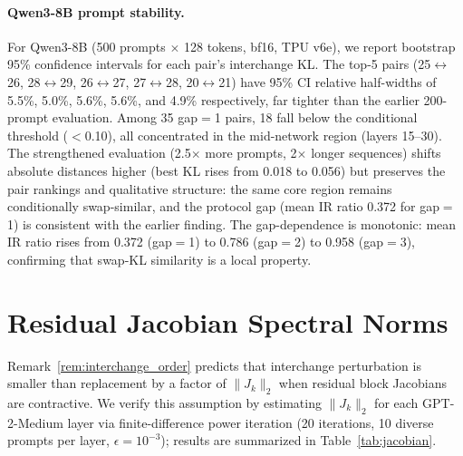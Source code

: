 \documentclass{article}
\begin{document}
\paragraph{Qwen3-8B prompt stability.}
For Qwen3-8B (500 prompts $\times$ 128 tokens, bf16, TPU v6e), we report bootstrap 95\% confidence intervals for each pair's interchange KL. The top-5 pairs (25$\leftrightarrow$26, 28$\leftrightarrow$29, 26$\leftrightarrow$27, 27$\leftrightarrow$28, 20$\leftrightarrow$21) have 95\% CI relative half-widths of 5.5\%, 5.0\%, 5.6\%, 5.6\%, and 4.9\% respectively, far tighter than the earlier 200-prompt evaluation. Among 35 gap$=$1 pairs, 18 fall below the conditional threshold ($<$0.10), all concentrated in the mid-network region (layers 15--30). The strengthened evaluation (2.5$\times$ more prompts, 2$\times$ longer sequences) shifts absolute distances higher (best KL rises from 0.018 to 0.056) but preserves the pair rankings and qualitative structure: the same core region remains conditionally swap-similar, and the protocol gap (mean IR ratio 0.372 for gap$=$1) is consistent with the earlier finding. The gap-dependence is monotonic: mean IR ratio rises from 0.372 (gap$=$1) to 0.786 (gap$=$2) to 0.958 (gap$=$3), confirming that swap-KL similarity is a local property.

\section{Residual Jacobian Spectral Norms}
\label{sec:app_jacobian}

Remark~\ref{rem:interchange_order} predicts that interchange perturbation is smaller than replacement by a factor of $\|J_k\|_2$ when residual block Jacobians are contractive. We verify this assumption by estimating $\|J_k\|_2$ for each GPT-2-Medium layer via finite-difference power iteration (20 iterations, 10 diverse prompts per layer, $\epsilon{=}10^{-3}$); results are summarized in Table~\ref{tab:jacobian}.
\end{document}
